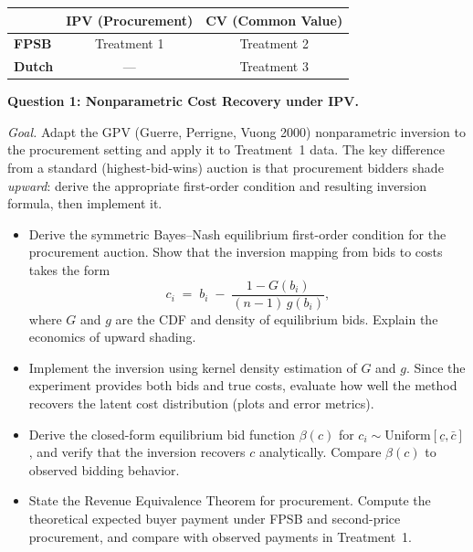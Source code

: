 \documentclass[11pt]{article}
\begin{document}
\begin{center}
\begin{tabular}{lcc}
\toprule
& \textbf{IPV (Procurement)} & \textbf{CV (Common Value)} \\
\midrule
\textbf{FPSB} & Treatment 1 & Treatment 2 \\
\textbf{Dutch} & --- & Treatment 3 \\
\bottomrule
\end{tabular}
\end{center}


\vspace{0.3cm}

\noindent\textbf{Question 1: Nonparametric Cost Recovery under IPV.}

\smallskip

\noindent\textit{Goal.} Adapt the GPV (Guerre, Perrigne, Vuong 2000) nonparametric inversion to the procurement setting and apply it to Treatment~1 data. The key difference from a standard (highest-bid-wins) auction is that procurement bidders shade \emph{upward}: derive the appropriate first-order condition and resulting inversion formula, then implement it.

\begin{itemize}[leftmargin=*]

\item[(a)] Derive the symmetric Bayes--Nash equilibrium first-order condition for the procurement auction. Show that the inversion mapping from bids to costs takes the form
$$
c_i \;=\; b_i \;-\; \frac{1 - G(b_i)}{(n-1)\,g(b_i)},
$$
where $G$ and $g$ are the CDF and density of equilibrium bids. Explain the economics of upward shading.

\item[(b)] Implement the inversion using kernel density estimation of $G$ and $g$. Since the experiment provides both bids and true costs, evaluate how well the method recovers the latent cost distribution (plots and error metrics).

\item[(c)] Derive the closed-form equilibrium bid function $\beta(c)$ for $c_i \sim \text{Uniform}[\underline{c}, \bar{c}]$, and verify that the inversion recovers $c$ analytically. Compare $\beta(c)$ to observed bidding behavior.

\item[(d)] State the Revenue Equivalence Theorem for procurement. Compute the theoretical expected buyer payment under FPSB and second-price procurement, and compare with observed payments in Treatment~1.

\end{itemize}
\end{document}
